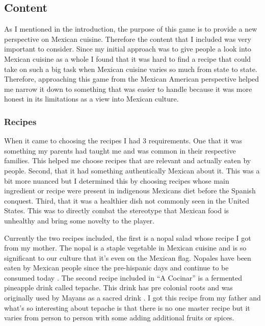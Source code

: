 \documentclass[10pt,twocolumn]{article}
\begin{document}
\subsection{Content}
As I mentioned in the introduction, the purpose of this game is to provide a new perspective on Mexican cuisine. Therefore the content that I included was very important to consider. Since my initial approach was to give people a look into Mexican cuisine as a whole I found that it was hard to find a recipe that could take on such a big task when Mexican cuisine varies so much from state to state. Therefore, approaching this game from the Mexican American perspective helped me narrow it down to something that was easier to handle because it was more honest in its limitations as a view into Mexican culture.

\subsubsection{Recipes}
When it came to choosing the recipes I had 3 requirements. One that it was something my parents had taught me and was common in their respective families. This helped me choose recipes that are relevant and actually eaten by people. Second, that it had something authentically Mexican about it. This was a bit more nuanced but I determined this by choosing recipes whose main ingredient or recipe were present in indigenous Mexicans diet before the Spanish conquest. Third, that it was a healthier dish not commonly seen in the United States. This was to directly combat the stereotype that Mexican food is unhealthy and bring some novelty to the player.  \par
Currently the two recipes included, the first is a nopal salad whose recipe I got from my mother. The nopal is a staple vegetable in Mexican cuisine and is so significant to our culture that it’s even on the Mexican flag. Nopales have been eaten by Mexican people since the pre-hispanic days and continue to be consumed today \cite{cacti2002}. The second recipe included in “A Cocinar'' is a fermented pineapple drink called tepache. This drink has pre colonial roots and was originally used by Mayans as a sacred drink \cite{tepache2021}. I got this recipe from my father and what's so interesting about tepache is that there is no one master recipe but it varies from person to person with some adding additional fruits or spices. 
\end{document}
